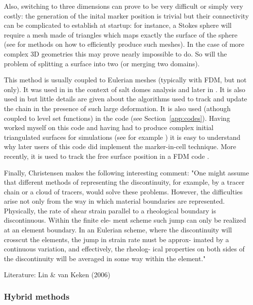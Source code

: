 Also, switching to three dimensions can prove to be very difficult or simply very 
costly: the generation of the inital marker position is trivial but their connectivity 
can be complicated to establish at startup: for instance, a Stokes sphere will require
a mesh made of triangles which maps exactly the surface of the sphere (see \cite{thie18,moma19} 
for methods on how to efficiently produce such meshes). In the case of more complex 3D geometries
this may prove nearly impossible to do. So will the problem of splitting a surface into two 
(or merging two domains).  

This method is usually coupled to Eulerian meshes (typically with FDM, but not only). 
It was used in \cite{woid78} in the context of salt domes analysis and later in \cite{chri82,chyu84}.
It is also used in \cite{vaks97} but little details are given about the algorithms used
to track and update the chain in the presence of such large deformation.
It is also used (athough coupled to level set functions) in the \douar code\cite{brtf08} 
(see Section~\ref{app:codes}). Having worked myself on this code and having had to produce 
complex initial triangulated surfaces for simulations (see for example \cite{lobh10}) it is 
easy to understand why later users of this code did implement the marker-in-cell technique.
More recently, it is used to track the free surface position in a FDM code \cite{dumy16,chmd19}.

Finally, Christensen \cite{chri92} makes the following interesting comment:  
"One might assume that different methods 
of representing the discontinuity, for example, by a tracer chain \cite{chyu84} or a cloud of 
tracers, would solve these problems. However, the difficulties 
arise not only from the way in which material boundaries are 
represented. Physically, the rate of shear strain parallel to a 
rheological boundary is discontinuous. Within the finite ele-
ment scheme such jump can only be realized at an element 
boundary. In an Eulerian scheme, where the discontinuity will 
crosscut the elements, the jump in strain rate must be approx- 
imated by a continuous variation, and effectively, the rheolog-
ical properties on both sides of the discontinuity will be 
averaged in some way within the element."

Literature: Lin \& van Keken (2006) \cite{liva05,liva06a,liva06b,kaus05,mulyukova}

\subsubsection{Hybrid methods}

